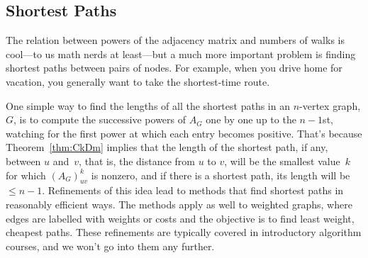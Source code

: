 \subsection{Shortest Paths}
The relation between powers of the adjacency matrix and numbers of
walks is cool---to us math nerds at least---but a much more important
problem is finding  shortest paths between
pairs of nodes.  For example, when you drive home for vacation, you
generally want to take the shortest-time route.

One simple way to find the lengths of all the shortest paths in an
$n$-vertex graph, $G$, is to compute the successive powers of $A_G$
one by one up to the $n-1$st, watching for the first power at which
each entry becomes positive.  That's because Theorem~\ref{thm:CkDm}
implies that the length of the shortest path, if any, between $u$
and~$v$, that is, the distance from $u$ to $v$, will be the smallest
value~$k$ for which $(A_G)_{uv}^k$ is nonzero, and if there is a
shortest path, its length will be $\leq n-1$.  Refinements of this
idea lead to methods that find shortest paths in reasonably efficient
ways.  The methods apply as well to weighted graphs, where edges are
labelled with weights or costs and the objective is to find least
weight, cheapest paths.  These refinements are typically covered in
introductory algorithm courses, and we won't go into them any
further.

